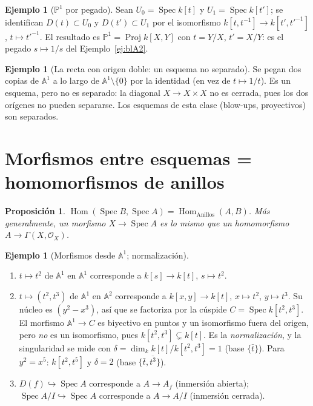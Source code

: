 \documentclass[11pt,a4paper,oneside]{book}
\newcommand{\Spec}{\operatorname{Spec}}
\newcommand{\Proj}{\operatorname{Proj}}
\newcommand{\A}{\mathbb{A}}
\newcommand{\PP}{\mathbb{P}}
\newcommand{\cO}{\mathcal{O}}
\theoremstyle{plain}
\newtheorem{proposicion}[teorema]{Proposición}
\theoremstyle{definition}
\newtheorem{ejemplo}[teorema]{Ejemplo}
\theoremstyle{remark}
\begin{document}
\begin{ejemplo}[$\PP^1$ por pegado]\label{ej:P1pegado}
Sean $U_0=\Spec k[t]$ y $U_1=\Spec k[t']$; se identifican $D(t)\subset U_0$ y $D(t')\subset U_1$ por el isomorfismo $k[t,t^{-1}]\to k[t',t'^{-1}]$, $t\mapsto t'^{-1}$. El resultado es $\PP^1=\Proj k[X,Y]$ con $t=Y/X$, $t'=X/Y$: es el pegado $s\mapsto1/s$ del Ejemplo~\ref{ej:blA2}.
\end{ejemplo}

\begin{ejemplo}[La recta con origen doble: un esquema no separado]\label{ej:doble}
Se pegan dos copias de $\A^1$ a lo largo de $\A^1\setminus\{0\}$ por la identidad (en vez de $t\mapsto1/t$). Es un esquema, pero no es separado: la diagonal $X\to X\times X$ no es cerrada, pues los dos orígenes no pueden separarse. Los esquemas de esta clase (blow-ups, proyectivos) son separados.
\end{ejemplo}

\section{Morfismos entre esquemas = homomorfismos de anillos}

\begin{proposicion}
$\operatorname{Hom}(\Spec B,\Spec A)=\operatorname{Hom}_{\mathrm{Anillos}}(A,B)$. Más generalmente, un morfismo $X\to\Spec A$ es lo mismo que un homomorfismo $A\to\Gamma(X,\cO_X)$.
\end{proposicion}

\begin{ejemplo}[Morfismos desde $\A^1$; normalización]\label{ej:normalizacion}
\begin{enumerate}[label=(\alph*)]
\item $t\mapsto t^2$ de $\A^1$ en $\A^1$ corresponde a $k[s]\to k[t]$, $s\mapsto t^2$.
\item $t\mapsto(t^2,t^3)$ de $\A^1$ en $\A^2$ corresponde a $k[x,y]\to k[t]$, $x\mapsto t^2$, $y\mapsto t^3$. Su núcleo es $(y^2-x^3)$, así que se factoriza por la cúspide $C=\Spec k[t^2,t^3]$. El morfismo $\A^1\to C$ es biyectivo en puntos y un isomorfismo fuera del origen, pero \emph{no} es un isomorfismo, pues $k[t^2,t^3]\subsetneq k[t]$. Es la \emph{normalización}, y la singularidad se mide con $\delta=\dim_kk[t]/k[t^2,t^3]=1$ (base $\{\bar t\}$). Para $y^2=x^5$: $k[t^2,t^5]$ y $\delta=2$ (base $\{\bar t,\overline{t^3}\}$).
\item $D(f)\hookrightarrow\Spec A$ corresponde a $A\to A_f$ (inmersión abierta); $\Spec A/I\hookrightarrow\Spec A$ corresponde a $A\to A/I$ (inmersión cerrada).
\end{enumerate}
\end{ejemplo}
\end{document}
